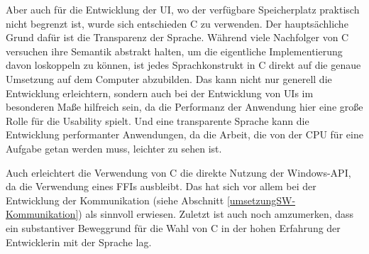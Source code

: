 Aber auch für die Entwicklung der \ac{UI}, wo der verfügbare Speicherplatz praktisch nicht begrenzt ist, wurde sich entschieden C zu verwenden.
Der hauptsächliche Grund dafür ist die Transparenz der Sprache.
Während viele Nachfolger von C versuchen ihre Semantik abstrakt halten, um die eigentliche Implementierung davon loskoppeln zu können, ist jedes Sprachkonstrukt in C direkt auf die genaue Umsetzung auf dem Computer abzubilden.
Das kann nicht nur generell die Entwicklung erleichtern, sondern auch bei der Entwicklung von \ac{UI}s im besonderen Maße hilfreich sein, da die Performanz der Anwendung hier eine große Rolle für die Usability spielt.
Und eine transparente Sprache kann die Entwicklung performanter Anwendungen, da die Arbeit, die von der CPU für eine Aufgabe getan werden muss, leichter zu sehen ist.

Auch erleichtert die Verwendung von C die direkte Nutzung der Windows-API, da die Verwendung eines \ac{FFI}s ausbleibt.
Das hat sich vor allem bei der Entwicklung der Kommunikation (siehe Abschnitt \ref{umsetzungSW-Kommunikation}) als sinnvoll erwiesen.
Zuletzt ist auch noch amzumerken, dass ein substantiver Beweggrund für die Wahl von C in der hohen Erfahrung der Entwicklerin mit der Sprache lag. %



